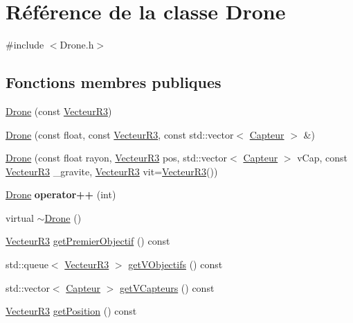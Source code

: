 \hypertarget{class_drone}{}\section{Référence de la classe Drone}
\label{class_drone}


{\ttfamily \#include $<$Drone.\+h$>$}

\subsection*{Fonctions membres publiques}
\begin{DoxyCompactItemize}
\item 
\mbox{\hyperlink{class_drone_a61e6934c19d51cecd69274b0c2f8f074}{Drone}} (const \mbox{\hyperlink{class_vecteur_r3}{Vecteur\+R3}})
\item 
\mbox{\hyperlink{class_drone_a1065b6a37230163bcd1b463c7a5121f7}{Drone}} (const float, const \mbox{\hyperlink{class_vecteur_r3}{Vecteur\+R3}}, const std\+::vector$<$ \mbox{\hyperlink{class_capteur}{Capteur}} $>$ \&)
\item 
\mbox{\hyperlink{class_drone_a11bd93fb5dccd88050ca2f89ab45617e}{Drone}} (const float rayon, \mbox{\hyperlink{class_vecteur_r3}{Vecteur\+R3}} pos, std\+::vector$<$ \mbox{\hyperlink{class_capteur}{Capteur}} $>$ v\+Cap, const \mbox{\hyperlink{class_vecteur_r3}{Vecteur\+R3}} \+\_\+gravite, \mbox{\hyperlink{class_vecteur_r3}{Vecteur\+R3}} vit=\mbox{\hyperlink{class_vecteur_r3}{Vecteur\+R3}}())
\item 
\mbox{\label{class_drone_a0403556305197eda99c2f7305c03b7ac}} 
\mbox{\hyperlink{class_drone}{Drone}} {\bfseries operator++} (int)
\item 
virtual \mbox{\hyperlink{class_drone_a667075abb1eb5c54be6418884a387d14}{$\sim$\+Drone}} ()
\item 
\mbox{\hyperlink{class_vecteur_r3}{Vecteur\+R3}} \mbox{\hyperlink{class_drone_ad8d5dda09c0e45c8d2c0f1f26a840f0e}{get\+Premier\+Objectif}} () const
\item 
std\+::queue$<$ \mbox{\hyperlink{class_vecteur_r3}{Vecteur\+R3}} $>$ \mbox{\hyperlink{class_drone_a11c5ec4c9211f217b2f0b11f46a1e627}{get\+V\+Objectifs}} () const
\item 
std\+::vector$<$ \mbox{\hyperlink{class_capteur}{Capteur}} $>$ \mbox{\hyperlink{class_drone_a0fb2eb8aa87f70b8f6d251f7b28feea4}{get\+V\+Capteurs}} () const
\item 
\mbox{\hyperlink{class_vecteur_r3}{Vecteur\+R3}} \mbox{\hyperlink{class_drone_a54d473991206bba12c44e5425779793e}{get\+Position}} () const

\end{DoxyCompactItemize}
